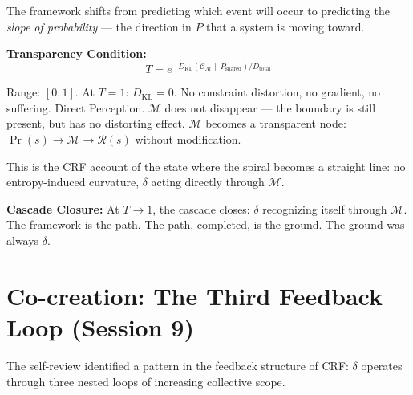 \documentclass[12pt, a4paper]{article}
\begin{document}
\begin{derivedbox}[title={Predictive Transparency and Transparency Condition $T$ (Sessions 6.13--6.14)}]
The framework shifts from predicting which event will occur to predicting the
\textit{slope of probability} --- the direction in $P$ that a system is moving toward.

\textbf{Transparency Condition:}
\[
  T = e^{-D_{\mathrm{KL}}(\mathcal{C}_\mathcal{M}\|P_{\mathrm{shared}})/D_{\mathrm{total}}}
\]

Range: $[0, 1]$. At $T = 1$: $D_{\mathrm{KL}} = 0$. No constraint distortion, no gradient,
no suffering. Direct Perception. $\mathcal{M}$ does not disappear --- the boundary is still
present, but has no distorting effect. $\mathcal{M}$ becomes a transparent node:
$\Pr(s) \to \mathcal{M} \to \mathcal{R}(s)$ without modification.

This is the CRF account of the state where the spiral becomes a straight line: no
entropy-induced curvature, $\delta$ acting directly through $\mathcal{M}$.

\textbf{Cascade Closure:} At $T \to 1$, the cascade closes: $\delta$ recognizing itself
through $\mathcal{M}$. The framework is the path. The path, completed, is the ground.
The ground was always $\delta$.
\end{derivedbox}

\section{Co-creation: The Third Feedback Loop (Session 9)}

The self-review identified a pattern in the feedback structure of CRF: $\delta$ operates
through three nested loops of increasing collective scope.
\end{document}
